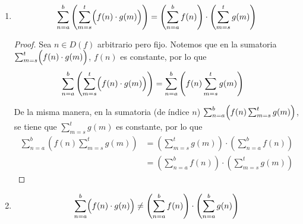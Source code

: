 \begin{enumerate}[label=\alph*)]
      
      
  
  \item \[\sum_{n=a}^{b} \left(\sum_{m=s}^{t} \Bigl(f(n) \cdot  g(m)\Bigr)\right) = \left(\sum_{n=a}^{b} f(n)\right)  \cdot \left(\sum_{m=s}^{t} g(m)\right)\]
  
  \begin{proof}\leavevmode
    Sea $n\in D(f)$ arbitrario pero fijo. Notemos que en la sumatoria $\sum_{m=s}^{t} \Bigl(f(n) \cdot  g(m)\Bigr)$, $f(n)$ es constante, por lo que
    \begin{align*}
      \sum_{n=a}^{b} \left(\sum_{m=s}^{t} \Bigl(f(n) \cdot  g(m)\Bigr)\right) &= \sum_{n=a}^{b} \left( f(n) \sum_{m=s}^{t} g(m)\right)
    \end{align*}

    De la misma manera, en la sumatoria (de índice $n$) $\sum_{n=a}^{b} \Bigl( f(n) \sum_{m=s}^{t} g(m)\Bigr)$, se tiene que $\sum_{m=s}^{t} g(m)$ es constante, por lo que
    \begin{align*}
      \sum_{n=a}^{b} \left( f(n) \sum_{m=s}^{t} g(m)\right) &= \left(\sum_{m=s}^{t} g(m)\right) \cdot \left(\sum_{n=a}^{b} f(n)\right)\\
      &= \left(\sum_{n=a}^{b} f(n)\right) \cdot \left(\sum_{m=s}^{t} g(m)\right)
    \end{align*}
  \end{proof}

  \item \[\sum_{n=a}^{b} \Bigl(f(n) \cdot  g(n)\Bigr) \neq \left(\sum_{n=a}^{b} f(n)\right)  \cdot \left(\sum_{n=a}^{b} g(n)\right)\]
  

\end{enumerate}
